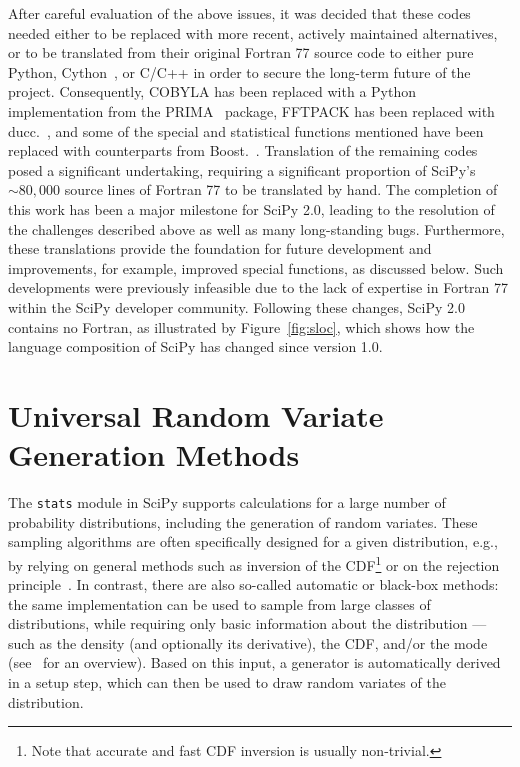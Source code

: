 \documentclass[acmsmall]{acmart}
\newcommand{\jake}[1]{\todo[inline, backgroundcolor=green!20!white]{Jake:~#1}}
\begin{document}
After careful evaluation of the above issues, it was decided that these
codes needed either to be replaced with
more recent, actively maintained alternatives, or to be translated from their
original Fortran 77 source code to either pure Python,
Cython~\cite{Behnel2011}, or C/C++ in order to secure the long-term future of the
project. Consequently, COBYLA has been replaced with
a Python implementation from the PRIMA~\cite{Zhang_2023} package, FFTPACK has been replaced with
ducc.\@fft~\cite{reinecke2019ducc}, and some of the special and statistical functions
mentioned have been replaced with counterparts from Boost.\@Math~\cite{boostmath}. Translation of the remaining
codes posed a significant undertaking, requiring a significant proportion of SciPy's
$\sim80{,}000$ source lines of Fortran 77 to be translated by hand. The completion of this work has been a major milestone for
SciPy 2.0, leading to the resolution of the challenges described above as well as many
long-standing bugs. Furthermore, these translations provide the foundation for
future development and improvements, for example, improved special functions, as
discussed below.
\jake{Add a forward reference to the relevant section.}
Such developments were previously infeasible
due to the lack of expertise in Fortran 77 within the SciPy developer community.
Following these changes, SciPy 2.0 contains no Fortran, as illustrated by
Figure~\ref{fig:sloc}, which shows how the language composition of SciPy has changed
since version 1.0.

\section{Universal Random Variate Generation Methods}

The \texttt{stats} module in SciPy supports calculations for a large number of
probability distributions, including the generation of random variates.
These sampling algorithms are often specifically designed for a given
distribution, e.g., by relying on general methods such as inversion of the
CDF\footnote{Note that accurate and fast CDF inversion is usually non-trivial.}
or on the rejection principle~\cite{vonneumann1951}. In contrast, there are
also so-called automatic or black-box methods: the same implementation can be
used to sample from large classes of distributions, while requiring only basic
information about the distribution --- such as the density (and optionally
its derivative), the CDF, and/or the mode (see~\cite{hormann2004} for an
overview). Based on this input, a generator is automatically derived in a
setup step, which can then be used to draw random variates of the
distribution.
\end{document}
